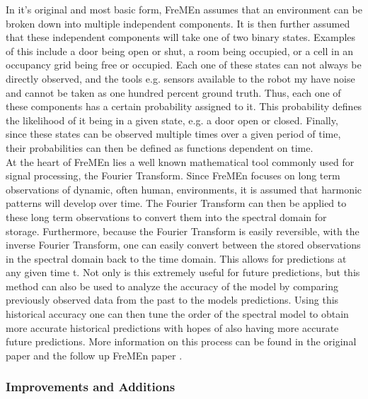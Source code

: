 In it's original and most basic form, FreMEn assumes that an environment can be
broken down into multiple independent components. It is then further assumed
that these independent components will take one of two binary states. Examples
of this include a door being open or shut, a room being occupied, or a cell in
an occupancy grid being free or occupied. Each one of these states can not
always be directly observed, and the tools e.g. sensors available to the robot
my have noise and cannot be taken as one hundred percent ground truth. Thus,
each one of these components has a certain probability assigned to it. This
probability defines the likelihood of it being in a given state, e.g. a door
open or closed.  Finally, since these states can be observed multiple times
over a given period of time, their probabilities can then be defined as
functions dependent on time. \\

At the heart of FreMEn lies a well known mathematical tool commonly used for
signal processing, the Fourier Transform. Since FreMEn focuses on long term
observations of dynamic, often human, environments, it is assumed that harmonic
patterns will develop over time. The Fourier Transform can then be applied to
these long term observations to convert them into the spectral domain for
storage. Furthermore, because the Fourier Transform is easily reversible,
with the inverse Fourier Transform, one can easily convert between the stored
observations in the spectral domain back to the time domain. This allows for
predictions at any given time t. Not only is this extremely useful for future
predictions, but this method can also be used to analyze the accuracy of the
model by comparing previously observed data from the past to the models
predictions. Using this historical accuracy one can then tune the order of the
spectral model to obtain more accurate historical predictions with hopes of
also having more accurate future predictions. More information on this process
can be found in the original paper\cite{Fentanes2014} and the follow up FreMEn
paper \cite{Krajnik2015}. \\

\subsubsection{ Improvements and Additions }

